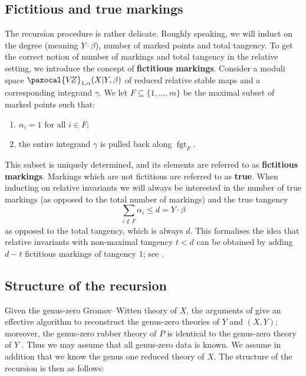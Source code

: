 \documentclass[11pt]{amsart}
\newcommand{\VZ}{\pazocal{V\!Z}}
\newcommand{\fgt}{\operatorname{fgt}}
\theoremstyle{definition}
\theoremstyle{definition}
\begin{document}
\subsection{Fictitious and true markings} The recursion procedure is rather delicate. Roughly speaking, we will induct on the degree (meaning $Y\cdot\beta$), number of marked points and total tangency. To get the correct notion of number of markings and total tangency in  the relative setting, we introduce the concept of \textbf{fictitious markings}. Consider a moduli space $\VZ_{1,\alpha}(X|Y,\beta)$ of reduced relative stable maps and a corresponding integrand $\gamma$. We let $F \subseteq \{1,\ldots,m\}$ be the maximal subset of marked points such that:
\begin{enumerate}
\item $\alpha_i = 1$ for all $i \in F$;
\item the entire integrand $\gamma$ is pulled back along $\fgt_F$.
\end{enumerate}
This subset is uniquely determined, and its elements are referred to as \textbf{fictitious markings}. Markings which are not fictitious are referred to as \textbf{true}. When inducting on relative invariants we will always be interested in the number of true markings (as opposed to the total number of markings) and the true tangency
\begin{equation*} \sum_{i \not\in F} \alpha_i \leq d=Y\cdot \beta \end{equation*}
as opposed to the total tangency, which is always $d$. This formalises the idea that relative invariants with non-maximal tangency $t<d$ can be obtained by adding $d-t$ fictitious markings of tangency $1$; see \cite[Lemma 1.15(i)]{Ga}.

\subsection{Structure of the recursion} Given the genus-zero Gromov--Witten theory of $X$, the arguments of \cite{Ga} give an effective algorithm to reconstruct the genus-zero theories of $Y$ and $(X,Y)$; moreover, the genus-zero rubber theory of $P$ is identical to the genus-zero theory of $Y$ \cite{GathmannThesis}. Thus we may assume that all genus-zero data is known. We assume in addition that we know the genus one reduced theory of $X$. The structure of the recursion is then as follows:
\end{document}
